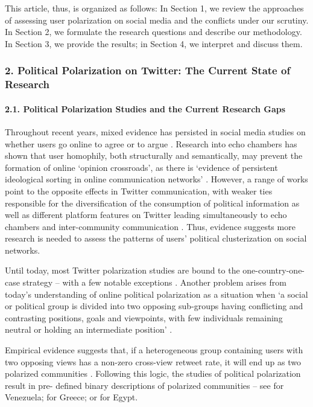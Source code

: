 This article, thus, is organized as follows: In Section 1, we review the approaches of assessing user polarization on social media and the conflicts under our scrutiny. In Section 2, we formulate the research questions and describe our methodology. In Section 3, we provide the results; in Section 4, we interpret and discuss them.

\subsubsection{2. Political Polarization on Twitter: The Current State of Research}

\paragraph{2.1. Political Polarization Studies and the Current Research Gaps}

Throughout recent years, mixed evidence has persisted in social media studies on whether users go online to agree or to argue \cite{YardiBoyd}. Research into echo chambers \cite{ColleoniRozzaArvidsson,Sunstein2002} has shown that user homophily, both structurally and semantically, may prevent the formation of online ‘opinion crossroads’, as there is ‘evidence of persistent ideological sorting in online communication networks’ \cite[p.~2]{Barbera}. However, a range of works point to the opposite effects in Twitter communication, with weaker ties responsible for the diversification of the consumption of political information \cite{Barbera} as well as different platform features on Twitter leading simultaneously to echo chambers and inter-community communication \cite{ConoverRatkiewiczFrancisco}. Thus, evidence suggests more research is needed to assess the patterns of users’ political clusterization on social networks.

Until today, most Twitter polarization studies are bound to the one-country-one-case strategy -- with a few notable exceptions \cite{Barbera,BarberaJostNagler}. Another problem arises from today’s understanding of online political polarization \cite{BramsonGrimSinger} as a situation when ‘a social or political group is divided into two opposing sub-groups having conflicting and contrasting positions, goals and viewpoints, with few individuals remaining neutral or holding an intermediate position’ \cite[p.~215]{CalaisGuerraMeiraJrCardie} \cite{Isenberg,Sunstein2002}.

Empirical evidence suggests that, if a heterogeneous group containing users with two opposing views has a non-zero cross-view retweet rate, it will end up as two polarized communities \cite{ConoverRatkiewiczFrancisco}. Following this logic, the studies of political polarization result in pre- defined binary descriptions of polarized communities -- see \cite{MoralesBorondoLosada} for Venezuela; 
\cite{AgathangelouKatakisRori} for Greece; or \cite{WeberGarimellaBatayneh} for Egypt.

